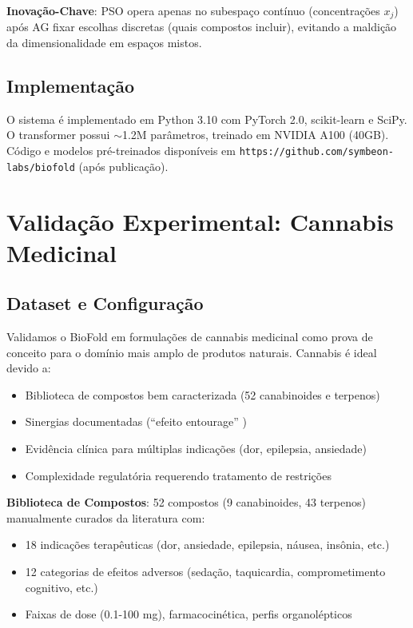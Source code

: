 \documentclass[11pt,a4paper]{article}
\begin{document}
\textbf{Inovação-Chave}: PSO opera apenas no subespaço contínuo (concentrações \(x_j\)) após AG fixar escolhas discretas (quais compostos incluir), evitando a maldição da dimensionalidade em espaços mistos.

\subsection{Implementação}

O sistema é implementado em Python 3.10 com PyTorch 2.0, scikit-learn e SciPy. O transformer possui \(\sim\)1.2M parâmetros, treinado em NVIDIA A100 (40GB). Código e modelos pré-treinados disponíveis em \texttt{https://github.com/symbeon-labs/biofold} (após publicação).

\section{Validação Experimental: Cannabis Medicinal}

\subsection{Dataset e Configuração}

Validamos o BioFold em formulações de cannabis medicinal como prova de conceito para o domínio mais amplo de produtos naturais. Cannabis é ideal devido a:
\begin{itemize}
    \item Biblioteca de compostos bem caracterizada (52 canabinoides e terpenos)
    \item Sinergias documentadas (``efeito entourage'' \cite{Russo2011})
    \item Evidência clínica para múltiplas indicações (dor, epilepsia, ansiedade)
    \item Complexidade regulatória requerendo tratamento de restrições
\end{itemize}

\textbf{Biblioteca de Compostos}: 52 compostos (9 canabinoides, 43 terpenos) manualmente curados da literatura com:
\begin{itemize}
    \item 18 indicações terapêuticas (dor, ansiedade, epilepsia, náusea, insônia, etc.)
    \item 12 categorias de efeitos adversos (sedação, taquicardia, comprometimento cognitivo, etc.)
    \item Faixas de dose (0.1-100 mg), farmacocinética, perfis organolépticos
\end{itemize}
\end{document}

